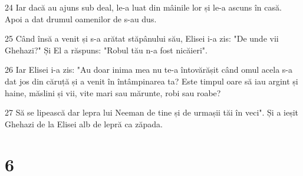 \par 24 Iar dacă au ajuns sub deal, le-a luat din mâinile lor și le-a ascuns în casă. Apoi a dat drumul oamenilor de s-au dus.
\par 25 Când însă a venit și s-a arătat stăpânului său, Elisei i-a zis: "De unde vii Ghehazi?" Și El a răspuns: "Robul tău n-a fost nicăieri".
\par 26 Iar Elisei i-a zis: "Au doar inima mea nu te-a întovărășit când omul acela s-a dat jos din căruță și a venit în întâmpinarea ta? Este timpul oare să iau argint și haine, măslini și vii, vite mari sau mărunte, robi sau roabe?
\par 27 Să se lipească dar lepra lui Neeman de tine și de urmașii tăi în veci". Și a ieșit Ghehazi de la Elisei alb de lepră ca zăpada.

\chapter{6}

